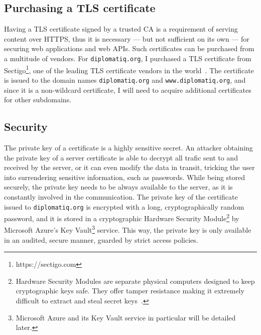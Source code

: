 \subsection{Purchasing a TLS certificate}

Having a TLS certificate signed by a trusted CA is a requirement of serving content over HTTPS, thus it is necessary — but not sufficient on its own — for securing web applications and web APIs. Such certificates can be purchased from a multitude of vendors. For \lstinline{diplomatiq.org}, I purchased a TLS certificate from Sectigo\footnote{https://sectigo.com}, one of the leading TLS certificate vendors in the world~\cite{sectigo-website}. The certificate is issued to the domain names \lstinline{diplomatiq.org} and \lstinline{www.diplomatiq.org}, and since it is a non-wildcard certificate, I will need to acquire additional certificates for other subdomains.

\subsection{Security}

The private key of a certificate is a highly sensitive secret. An attacker obtaining the private key of a server certificate is able to decrypt all trafic sent to and received by the server, or it can even modify the data in transit, tricking the user into surrendering sensitive information, such as passwords. While being stored securely, the private key needs to be always available to the server, as it is constantly involved in the communication. The private key of the certificate issued to \lstinline{diplomatiq.org} is encrypted with a long, cryptographically random password, and it is stored in a cryptographic Hardware Security Module\footnote{Hardware Security Modules are separate physical computers designed to keep cryptographic keys safe. They offer tamper resistance making it extremely difficult to extract and steal secret keys~\cite{fips-140-3}.} by Microsoft Azure's Key Vault\footnote{Microsoft Azure and its Key Vault service in particular will be detailed later.} service. This way, the private key is only available in an audited, secure manner, guarded by strict access policies.

